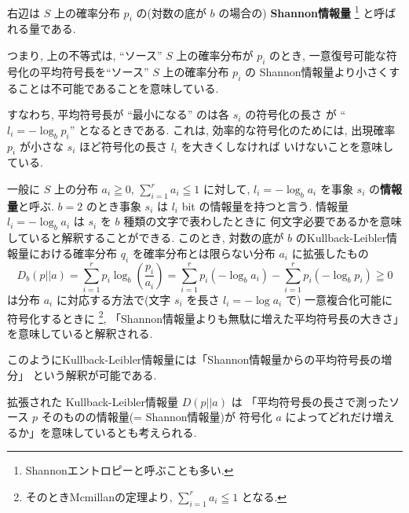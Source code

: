 \documentclass[12pt,twoside]{jarticle}
\theoremstyle{jplain}
\theoremstyle{jplain}
\theoremstyle{jplain}
\numberwithin{theorem}{section}
\numberwithin{equation}{section}
\numberwithin{figure}{section}
\numberwithin{table}{section}
\begin{document}
右辺は $S$ 上の確率分布 $p_i$ の(対数の底が $b$ の場合の)
{\bfseries Shannon情報量}%
\footnote{Shannonエントロピーと呼ぶことも多い.}%
と呼ばれる量である.

つまり, 上の不等式は, ``ソース'' $S$ 上の確率分布が $p_i$ のとき,
一意復号可能な符号化の平均符号長を``ソース'' $S$ 上の確率分布 $p_i$ の
Shannon情報量より小さくすることは不可能であることを意味している.

すなわち, 平均符号長が ``最小になる'' のは各 $s_i$ の符号化の長さ
が ``$l_i = -\log_b p_i$'' となるときである.
これは, 効率的な符号化のためには,
出現確率 $p_i$ が小さな $s_i$ ほど符号化の長さ $l_i$ を大きくしなければ
いけないことを意味している.

一般に $S$ 上の分布 $a_i\geqq 0$, $\sum_{i=1}^r a_i\leqq 1$ に対して,
$l_i=-\log_b a_i$ を事象 $s_i$ の{\bfseries 情報量}と呼ぶ.
$b=2$ のとき事象 $s_i$ は $l_i$ bit の情報量を持つと言う.
情報量 $l_i=-\log_b a_i$ は $s_i$ を $b$ 種類の文字で表わしたときに
何文字必要であるかを意味していると解釈することができる.
このとき, 対数の底が $b$ のKullback-Leibler情報量における確率分布 $q_i$
を確率分布とは限らない分布 $a_i$ に拡張したもの
\[
D_b(p||a)
=\sum_{i=1}^r p_i\log_b\left(\frac{p_i}{a_i}\right)
=\sum_{i=1}^r p_i(-\log_b a_i) - \sum_{i=1}^r p_i(-\log_b p_i)
\geqq 0
\]
は分布 $a_i$ に対応する方法で(文字 $s_i$ を長さ $l_i=-\log a_i$ で)
一意複合化可能に符号化するときに%
\footnote{そのときMcmillanの定理より, $\sum_{i=1}^r a_i\leqq 1$ となる.},
「Shannon情報量よりも無駄に増えた平均符号長の大きさ」を意味していると解釈される.

このようにKullback-Leibler情報量には「Shannon情報量からの平均符号長の増分」
という解釈が可能である.

拡張された Kullback-Leibler情報量 $D(p||a)$ は
「平均符号長の長さで測ったソース $p$ そのものの情報量(= Shannon情報量)が
符号化 $a$ によってどれだけ増えるか」を意味しているとも考えられる.

\end{document}
